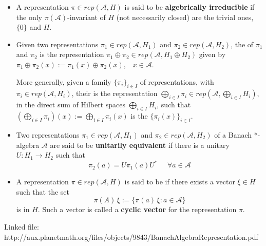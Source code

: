 \documentclass[12pt]{article}
\begin{document}
\begin{itemize}
\item A representation $\pi \in rep(\mathcal{A},H)$ is said to be {\bf algebrically irreducible} if the only $\pi(\mathcal{A})$-invariant  of $H$ (not necessarily closed) are the trivial ones, $\{0\}$ and $H$.
\end{itemize}

\begin{itemize}
\item Given two representations $\pi_1 \in rep(\mathcal{A},H_1)$ and $\pi_2 \in rep(\mathcal{A},H_2)$, the  of $\pi_1$ and $\pi_2$ is the representation $\pi_1 \oplus \pi_2 \in rep(\mathcal{A}, H_1 \oplus H_2)$ given by $\pi_1 \oplus \pi_2 (x) := \pi_1 (x) \oplus \pi_2 (x), \;\;\; x \in \mathcal{A}$.

More generally, given a family $\{\pi_i\}_{i \in I}$ of representations, with $\pi_i \in rep(\mathcal{A}, H_i)$, their  is the representation $\bigoplus_{i \in I} \pi_i \in rep(\mathcal{A}, \bigoplus_{i \in I}H_i)$, in the direct sum of Hilbert spaces $\bigoplus_{i \in I}H_i$, such that $\left(\bigoplus_{i \in I} \pi_i\right) (x):= \bigoplus_{i \in I} \pi_i(x)$ is the  $\{\pi_i(x)\}_{i \in I}$.
\end{itemize}

\begin{itemize}
\item Two representations $\pi_1 \in rep(\mathcal{A},H_1)$ and $\pi_2 \in rep(\mathcal{A},H_2)$ of a  Banach *-algebra $\mathcal{A}$ are said to be {\bf unitarily equivalent} if there is a unitary $U : H_1 \longrightarrow H_2$ such that
\begin{displaymath}
\pi_2(a) = U \pi_1(a) U^* \;\;\;\;\; \forall a \in \mathcal{A}
\end{displaymath}
\end{itemize}

\begin{itemize}
\item A representation $\pi \in rep(\mathcal{A},H)$ is said to be {\bf {}} if there exists a vector $\xi \in H$ such that the set
\begin{displaymath}
\pi(A)\,\xi := \{\pi(a)\,\xi : a \in \mathcal{A}\}
\end{displaymath}
is  in $H$. Such a vector is called a {\bf cyclic vector} for the representation $\pi$.
\end{itemize}



Linked file: http://aux.planetmath.org/files/objects/9843/BanachAlgebraRepresentation.pdf

\end{document}
